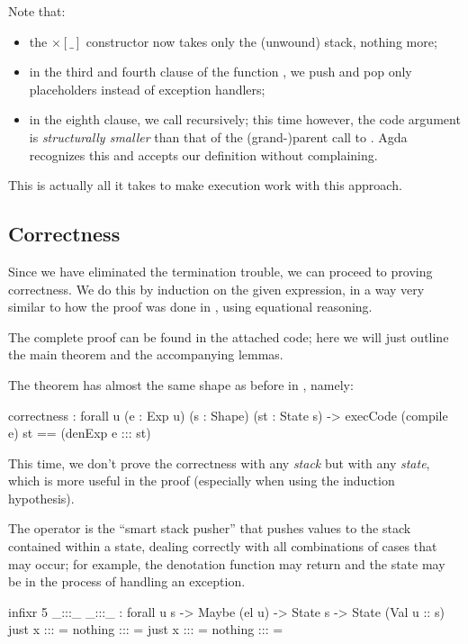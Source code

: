 \noindent Note that:
\begin{itemize}
	\item the $\times[\_]$ constructor now takes only the (unwound) stack, nothing more;
	\item in the third and fourth clause of the function ,
		we push and pop only placeholders instead of exception handlers;
	\item in the eighth clause, we call  recursively; this time however,
		the code argument  is \emph{structurally smaller} than that of
		the (grand-)parent call to . Agda recognizes this and
		accepts our definition without complaining.
\end{itemize}
This is actually all it takes to make execution work with this approach.

\subsection{Correctness}

Since we have eliminated the termination trouble, we can proceed to proving
correctness. We do this by induction on the given expression, in a way
very similar to how the proof was done in , using
equational reasoning.

 The complete proof can be found
in the attached code; here we will just outline the main theorem and the
accompanying lemmas.

The theorem has almost the same shape as before in ,
namely:
\begin{code}
  correctness : forall {u} (e : Exp u) (s : Shape) (st : State s)
    -> execCode (compile e) st == (denExp e ::: st)
\end{code}\label{sec:hau-correctness}

\noindent This time, we don't prove the correctness with any \emph{stack} but
with any \emph{state}, which is more useful in the proof (especially when
using the induction hypothesis).

The operator \ident{:::} is the ``smart stack pusher'' that pushes values
to the stack contained within a state, dealing correctly with all combinations
of cases that may occur; for example, the denotation function 
may return  and the state  may be in the process
of handling an exception.

\begin{codei}
  infixr 5 _:::_
  _:::_ : forall {u s} -> Maybe (el u) -> State s -> State (Val u :: s)
  just x	:::	\tick[ st ]		= \tick[ x \scons st ]
  nothing	:::	\tick[ st ]		= 
  just x	:::	\x[ n , st ]	= \x[ n , st ]
  nothing	:::	\x[ n , st ]	= \x[ n , st ]
\end{codei}

